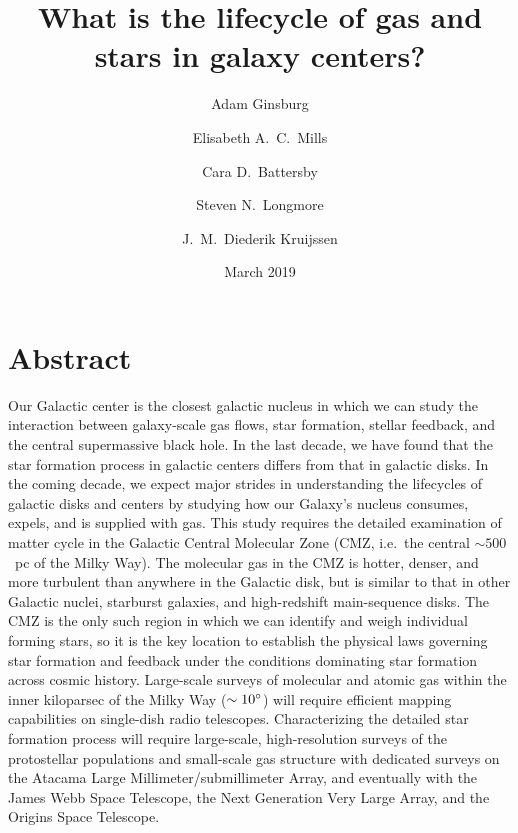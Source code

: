 \documentclass[modern]{aastex62}
\begin{document}
\author{Adam Ginsburg}
\author{Elisabeth A.~C.~Mills}
\author{Cara D.~Battersby}
\author{Steven N.~Longmore}
\author{J.~M.~Diederik Kruijssen}

\title{What is the lifecycle of gas and stars in galaxy centers?}
\date{March 2019}

\section*{}





\section*{Abstract}
Our Galactic center is the closest galactic nucleus in which we can study the
interaction between galaxy-scale gas flows, star formation, stellar feedback,
and the central supermassive black hole. In the last decade, we have found
that the star formation process in galactic centers differs from that in
galactic disks. In the coming decade, we expect major strides in understanding
the lifecycles of galactic disks and centers by studying how our Galaxy's
nucleus consumes, expels, and is supplied with gas. This study requires the detailed
examination of matter cycle in the Galactic Central Molecular Zone (CMZ,
i.e.~the central $\sim500$~pc of the Milky Way). The molecular gas in the CMZ
is hotter, denser, and more turbulent than anywhere in the Galactic disk, but
is similar to that in other Galactic nuclei, starburst galaxies, and
high-redshift main-sequence disks. The CMZ is the only such region in which we
can identify and weigh individual forming stars, so it is the key location to
establish the physical laws governing star formation and feedback under the
conditions dominating star formation across cosmic history. Large-scale surveys
of molecular and atomic gas within the inner kiloparsec of the Milky Way
($\sim10^{\circ}$) will require efficient mapping capabilities on single-dish
radio telescopes. Characterizing the detailed star formation process will
require large-scale, high-resolution surveys of the protostellar populations
and small-scale gas structure with dedicated surveys on the Atacama Large
Millimeter/submillimeter Array, and eventually with the James Webb Space
Telescope, the Next Generation Very Large Array, and the Origins Space
Telescope.
\vspace{5mm}
\end{document}
